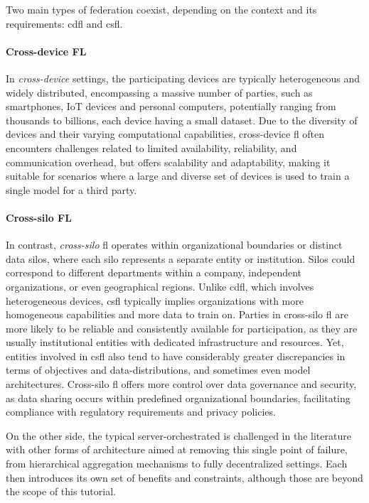 \documentclass[conference]{IEEEtran}
\begin{document}
Two main types of federation coexist, depending on the context and its requirements: \gls{cdfl} and \gls{csfl}.

\paragraph*{Cross-device FL} In \emph{cross-device} settings, the participating devices are typically heterogeneous and widely distributed, encompassing a massive number of parties, such as smartphones, IoT devices and personal computers, potentially ranging from thousands to billions, each device having a small dataset.
Due to the diversity of devices and their varying computational capabilities, cross-device \gls{fl} often encounters challenges related to limited availability, reliability, and communication overhead, but offers scalability and adaptability, making it suitable for scenarios where a large and diverse set of devices is used to train a single model for a third party.

\paragraph*{Cross-silo FL} In contrast, \emph{cross-silo} \gls{fl} operates within organizational boundaries or distinct data silos, where each silo represents a separate entity or institution.
Silos could correspond to different departments within a company, independent organizations, or even geographical regions.
Unlike \gls{cdfl}, which involves heterogeneous devices, \gls{csfl} typically implies organizations with more homogeneous capabilities and more data to train on.
Parties in cross-silo \gls{fl} are more likely to be reliable and consistently available for participation, as they are usually institutional entities with dedicated infrastructure and resources.
Yet, entities involved in \gls{csfl} also tend to have considerably greater discrepancies in terms of objectives and data-distributions, and sometimes even model architectures.
Cross-silo \gls{fl} offers more control over data governance and security, as data sharing occurs within predefined organizational boundaries, facilitating compliance with regulatory requirements and privacy policies.

On the other side, the typical server-orchestrated is challenged in the literature with other forms of architecture aimed at removing this single point of failure, from hierarchical aggregation mechanisms to fully decentralized settings.
Each then introduces its own set of benefits and constraints, although those are beyond the scope of this tutorial.
\end{document}
